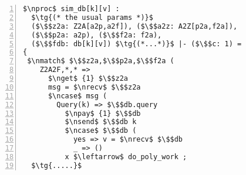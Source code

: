 \begin{lstlisting}[basicstyle=\scriptsize\BeraMonottFamily, frame=single, mathescape, numbers=left, xleftmargin=2em, xrightmargin=2em]
$\nproc$ sim_db[k][v] : 
  $\tg{(* the usual params *)}$
  ($\$$z2a: Z2A[a2p,a2f]), ($\$$a2z: A2Z[p2a,f2a]),
  ($\$$p2a: a2p), ($\$$f2a: f2a),
  ($\$$fdb: db[k][v]) $\tg{(*...*)}$ |- ($\$$c: 1) =
{
 $\nmatch$ $\$$z2a,$\$$p2a,$\$$f2a (
    Z2A2F,*,* =>
      $\nget$ {1} $\$$z2a
      msg = $\nrecv$ $\$$z2a
      $\ncase$ msg (
        Query(k) => $\$$db.query
          $\npay$ {1} $\$$db
          $\nsend$ $\$$db k
          $\ncase$ $\$$db (
            yes => v = $\nrecv$ $\$$db 
            _ => ()
          x $\leftarrow$ do_poly_work ;
  $\tg{.....}$
\end{lstlisting}



